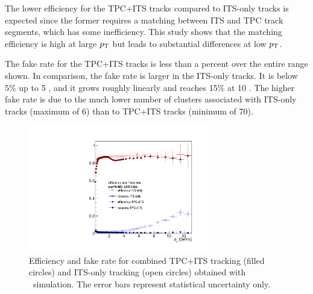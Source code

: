 The lower efficiency for the TPC+ITS tracks compared to ITS-only tracks is expected since the former requires a matching between ITS and TPC track segments, which has some inefficiency. This study shows that the matching efficiency is high at large $p_{\mathrm{T}}$ but leads to substantial differences at low $p_{\mathrm{T}}$.  


The fake rate for the TPC+ITS tracks is less than a percent over the entire range shown. In comparison, the fake rate is larger in the ITS-only tracks. It is below 5\% up to 5 \GeVc, and it grows roughly linearly and reaches 15\%  at 10 \GeVc. The higher fake rate is due to the much lower number of clusters associated with ITS-only tracks (maximum of 6) than to TPC+ITS tracks (minimum of 70).
\begin{figure}[h]
\center
\includegraphics[width=0.7\textwidth]{Data_Analysis/Tracking/HybridAndITS_Eff_fakerate_pPb_lowpt.pdf}
\caption{Efficiency and fake rate for combined TPC+ITS tracking (filled circles) and ITS-only tracking (open circles) obtained with \pPb~simulation. The error bars represent statistical uncertainty only.}
\label{fig:tpcEff}
\end{figure}

\FloatBarrier

